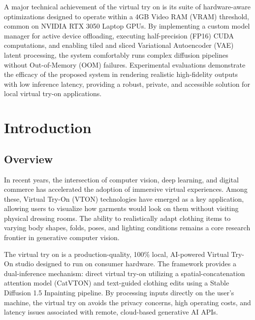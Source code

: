\documentclass[12pt, a4paper]{report}
\begin{document}
A major technical achievement of the virtual try on is its suite of hardware-aware optimizations designed to operate within a 4GB Video RAM (VRAM) threshold, common on NVIDIA RTX 3050 Laptop GPUs. By implementing a custom model manager for active device offloading, executing half-precision (FP16) CUDA computations, and enabling tiled and sliced Variational Autoencoder (VAE) latent processing, the system comfortably runs complex diffusion pipelines without Out-of-Memory (OOM) failures. Experimental evaluations demonstrate the efficacy of the proposed system in rendering realistic high-fidelity outputs with low inference latency, providing a robust, private, and accessible solution for local virtual try-on applications.

\newpage
\tableofcontents






\chapter{Introduction}

\section{Overview}

In recent years, the intersection of computer vision, deep learning, and digital commerce has accelerated the adoption of immersive virtual experiences. Among these, Virtual Try-On (VTON) technologies have emerged as a key application, allowing users to visualize how garments would look on them without visiting physical dressing rooms. The ability to realistically adapt clothing items to varying body shapes, folds, poses, and lighting conditions remains a core research frontier in generative computer vision.

The virtual try on is a production-quality, 100\% local, AI-powered Virtual Try-On studio designed to run on consumer hardware. The framework provides a dual-inference mechanism: direct virtual try-on utilizing a spatial-concatenation attention model (CatVTON) and text-guided clothing edits using a Stable Diffusion 1.5 Inpainting pipeline. By processing inputs directly on the user's machine, the virtual try on avoids the privacy concerns, high operating costs, and latency issues associated with remote, cloud-based generative AI APIs.
\end{document}
